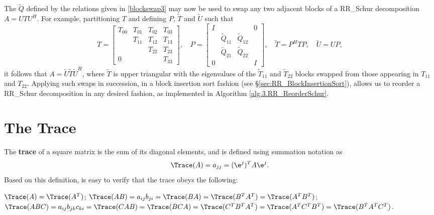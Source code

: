 The $\tilde Q$ defined by the relations given in \eqref{blockswap3} may now be used to swap any two adjacent blocks of a RR_Schur decomposition $A=U T U^H$.
For example, partitioning $T$ and defining $P$, $\tilde T$ and $\tilde U$ such that
\begin{equation*}
T=\begin{bmatrix} T_{00} & T_{01} & T_{02} & T_{03} \\  & T_{11} & T_{12} & T_{13} \\ &  & T_{22} & T_{23} \\ 0 &  &  & T_{33} \end{bmatrix}, \quad
P=\begin{bmatrix} I & &  & 0 \\ & \tilde Q_{11} & \tilde Q_{12} & \\ & \tilde Q_{21} & \tilde Q_{22} & \\ 0 & & & I \end{bmatrix}, \quad
\tilde T=P^H T P, \quad \tilde U=U P,
\end{equation*}
it follows that $A=\tilde U \tilde T \tilde U^H$, where $\tilde T$ is upper triangular with the eigenvalues of the $\tilde T_{11}$ and $\tilde T_{22}$ blocks swapped from those
appearing in $T_{11}$ and $T_{22}$.
Applying such swaps in succession, in a block insertion sort fashion (see \S \ref{sec:RR_BlockInsertionSort}),
allows us to reorder a RR_Schur decomposition in any desired fashion, as implemented in Algorithm \ref{alg.3.RR_ReorderSchur}. 

\section{The Trace}\label{sec.A.F.A}

The {\bf trace} of a square matrix is the sum of its diagonal elements, and is defined using summation notation as
\begin{equation*}
    \Trace(A)= a_{jj} = (\e^j)^T A \e^j.
\end{equation*}
Based on this definition,  is easy to verify that the trace obeys the following:

\begin{fact} \label{fact.A.F.A.a}
$\Trace(A)=\Trace(A^T)$;\quad
$\Trace(AB)= a_{ij} b_{ji} = \Trace(BA) = \Trace(B^T A^T) = \Trace(A^T B^T)$;\hfill\break
$\Trace(ABC)= a_{ij} b_{jk} c_{ki} =\Trace(CAB)=\Trace(BCA)=\Trace(C^T B^T A^T)=\Trace( A^T C^T B^T)=\Trace(B^T A^T C^T)$.
\end{fact}


